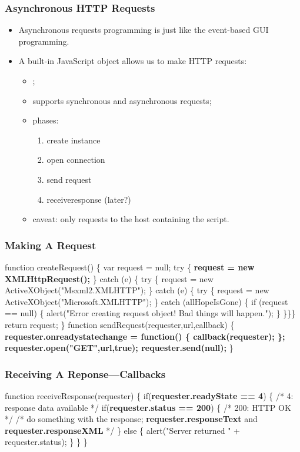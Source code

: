 \documentclass[svgnames]{beamer}
\begin{document}
\begin{frame}
\frametitle{Asynchronous HTTP Requests}

  \begin{itemize}
  \item Asynchronous requests programming is just like the event-based
    GUI programming. 
  \item A built-in JavaScript object allows us to make HTTP requests:
    \begin{itemize}
    \item {};
    \item supports synchronous and asynchronous requests;
    \item phases:
      \begin{enumerate}
      \item create instance
      \item open connection
      \item send request
      \item receiveresponse (later?)
      \end{enumerate}
    \item caveat: only requests to the host containing the script.
    \end{itemize}
  \end{itemize}
\end{frame}

\begin{frame}[fragile]
\frametitle{Making A Request}

\begin{semiverbatim}\footnotesize
function createRequest() \{
  var request = null;
  try \{ \textbf{request = new XMLHttpRequest();} \} catch (e) \{ 
  try \{ request = new ActiveXObject("Msxml2.XMLHTTP"); \} catch (e) \{ 
  try \{ request = new ActiveXObject("Microsoft.XMLHTTP"); \}
  catch (allHopeIsGone) \{
    if (request == null) \{
      alert("Error creating request object! Bad things will happen.");
    \}  
  \}\}\}
  return request;
\}
function sendRequest(requester,url,callback) \{
  \textbf{requester.onreadystatechange = function() \{
    callback(requester);
  \};
  requester.open("GET",url,true);
  requester.send(null);}
\}
\end{semiverbatim}
\end{frame}

\begin{frame}[fragile]\frametitle{Receiving A Reponse---Callbacks}

\begin{semiverbatim}\footnotesize
function receiveResponse(requester) \{
  if(\textbf{requester.readyState == 4}) \{ /* 4: response data available */
    if(\textbf{requester.status == 200}) \{ /* 200: HTTP OK */
      /* do something with the response;
         \textbf{requester.responseText} and \textbf{requester.responseXML}
      */
    \} else \{
      alert("Server returned " + requester.status);
    \}
  \}
\}
\end{semiverbatim}

\end{frame}
\end{document}
